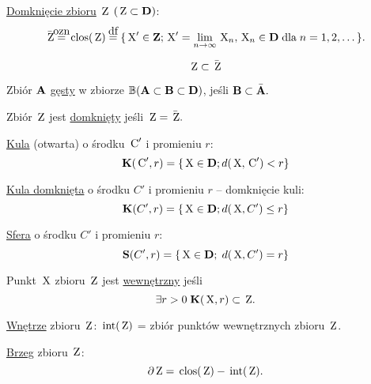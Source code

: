 \begin{mydef}
    \underline{Domknięcie zbioru} $\mathbf{\,\textnormal{Z}}$ $(\mathbf{\,\textnormal{Z}} \subset \mathbf{D})$:
    \[\bar{\set{\p{Z}}} \ozn \clos(\set{\p{Z}}) \df \{\p{X}' \in \set{Z}; \p{X}'=\lim_{n\to\infty}\p{X}_n, \p{X}_n \in \set{D} \;\text{dla}\; n=1,2,\dots\}.\]
\end{mydef}

\begin{info}
    \[\mathbf{\,\textnormal{Z}} \subset \bar{\mathbf{\,\textnormal{Z}}}\]
\end{info}

\begin{mydef}
    Zbiór $\mathbf{A}$ \underline{gęsty} w zbiorze $\mathbb{B}(\mathbf{A}\subset\mathbf{B}\subset\mathbf{D})$, jeśli $\mathbf{B} \subset \bar{\mathbf{A}}.$
\end{mydef}

\begin{mydef}
    Zbiór $\mathbf{\,\textnormal{Z}}$ jest \underline{domknięty} jeśli $\mathbf{\,\textnormal{Z}} = \bar{\mathbf{\,\textnormal{Z}}}.$
\end{mydef}

\begin{mydef}
    \underline{Kula} (otwarta) o środku $\,\textnormal{C}'$ i promieniu $r$:
    \[\mathbf{K}(\,\textnormal{C}', r) = \{\,\textnormal{X}\in \mathbf{D}; d(\,\textnormal{X}, \,\textnormal{C}') < r\}\]
\end{mydef}

\begin{mydef}
    \underline{Kula domknięta} o środku $C'$ i promieniu $r$ -- domknięcie kuli: \[\mathbf{K}(C', r) = \{\,\textnormal{X} \in \mathbf{D}; d(\,\textnormal{X}, C') \leq r\}\]
\end{mydef}

\begin{mydef}
    \underline{Sfera} o środku $C'$ i promieniu $r$:
    \[\mathbf{S}(C', r) = \{\,\textnormal{X}\in\mathbf{D};\; d(\,\textnormal{X}, C') = r\}\]
\end{mydef}

\begin{mydef}
    Punkt $\,\textnormal{X}$ zbioru $\mathbf{\,\textnormal{Z}}$ jest \underline{wewnętrzny} jeśli
    \[\exists r > 0\; \mathbf{K}(\,\textnormal{X}, r) \subset \mathbf{\,\textnormal{Z}}.\]
\end{mydef}

\begin{mydef}
    \underline{Wnętrze} zbioru $\mathbf{\,\textnormal{Z}}$: $\,\textnormal{int} (\mathbf{\,\textnormal{Z}})$ = zbiór punktów wewnętrznych zbioru $\mathbf{\,\textnormal{Z}}$.
\end{mydef}

\begin{mydef}
    \underline{Brzeg} zbioru $\mathbf{\,\textnormal{Z}}$:
    \[\partial \mathbf{\,\textnormal{Z}} = \,\textnormal{clos}(\mathbf{\,\textnormal{Z}}) - \,\textnormal{int}(\mathbf{\,\textnormal{Z}}).\]
\end{mydef}


